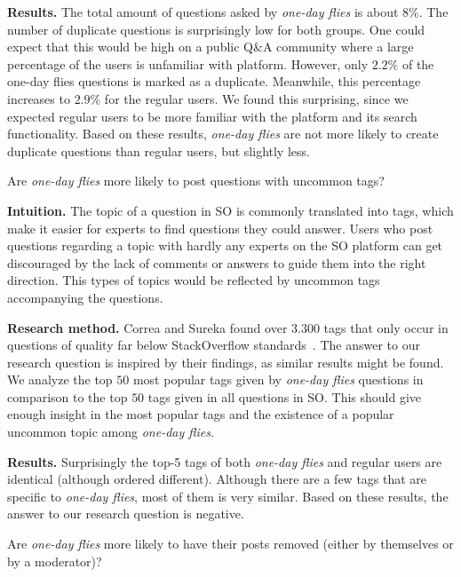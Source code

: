\documentclass[conference]{IEEEtran}
\newcommand\odf{\emph{one-day flies}\xspace}
\begin{document}
\textbf{Results.} The total amount of questions asked by \odf is about 8\%. The
number of duplicate questions is surprisingly low for both groups. One could
expect that this would be high on a public Q\&A community where a large
percentage of the users is unfamiliar with platform. However, only $2.2\%$ of
the one-day flies questions is marked as a duplicate. Meanwhile, this
percentage increases to $2.9\%$ for the regular users. We found this
surprising, since we expected regular users to be more familiar with the
platform and its search functionality. Based on these results, \odf are not
more likely to create duplicate questions than regular users, but slightly
less.\\


\begin{tcolorbox}[size=fbox,title=RQ2: Uncommon Tags]
Are \odf more likely to post questions with uncommon tags?
\end{tcolorbox}

\textbf{Intuition.} The topic of a question in SO is commonly translated into
tags, which make it easier for experts to find questions they could answer.
Users who post questions regarding a topic with hardly any experts on the SO
platform can get discouraged by the lack of comments or answers to guide them
into the right direction. This types of topics would be reflected by uncommon
tags accompanying the questions. 
 
\textbf{Research method.} Correa and Sureka found over $3.300$ tags that only
occur in questions of quality far below StackOverflow
standards~\cite{correa2014chaff}. The answer to our research question is
inspired by their findings, as similar results might be found. We analyze the
top $50$ most popular tags given by \odf questions in comparison to the top
$50$ tags given in all questions in SO. This should give enough insight in the
most popular tags and the existence of a popular uncommon topic among \odf.

\textbf{Results.} Surprisingly the top-5 tags of both \odf and regular users
are identical (although ordered different). Although there are a few tags that
are specific to \odf, most of them is very similar. Based on these results, the
answer to our research question is negative.\\

\begin{tcolorbox}[size=fbox,title=RQ3: Deleted Questions]
Are \odf more likely to have their posts removed (either by
themselves or by a moderator)?
\end{tcolorbox}
\end{document}
